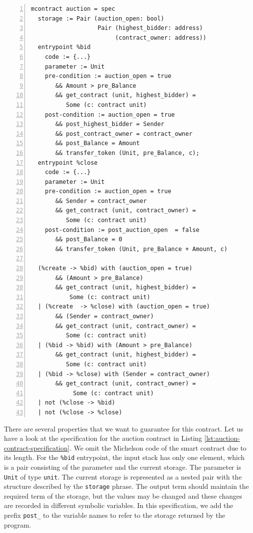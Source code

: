 \documentclass[a4paper,USenglish,cleveref, autoref,anonymous]{lipics-v2021}
\begin{document}
\begin{lstlisting}[float=tp,captionpos=b,caption={Auction contract specification},label={lst:auction-contract-specification},numbers=left]
mcontract auction = spec 
  storage := Pair (auction_open: bool) 
                   Pair (highest_bidder: address)
                        (contract_owner: address))
  entrypoint %bid
    code := {...}
    parameter := Unit 
    pre-condition := auction_open = true
       && Amount > pre_Balance
       && get_contract (unit, highest_bidder) = 
          Some (c: contract unit)
    post-condition := auction_open = true
       && post_highest_bidder = Sender 
       && post_contract_owner = contract_owner 
       && post_Balance = Amount 
       && transfer_token (Unit, pre_Balance, c);
  entrypoint %close
    code := {...}
    parameter := Unit
    pre-condition := auction_open = true
       && Sender = contract_owner  
       && get_contract (unit, contract_owner) = 
          Some (c: contract unit)              
    post-condition := post_auction_open  = false
       && post_Balance = 0 
       && transfer_token (Unit, pre_Balance + Amount, c) 

  (%create -> %bid) with (auction_open = true)  
       && (Amount > pre_Balance) 
       && get_contract (unit, highest_bidder) = 
           Some (c: contract unit)
  | (%create  -> %close) with (auction_open = true) 
       && (Sender = contract_owner)
       && get_contract (unit, contract_owner) = 
          Some (c: contract unit)
  | (%bid -> %bid) with (Amount > pre_Balance) 
       && get_contract (unit, highest_bidder) = 
          Some (c: contract unit)
  | (%bid -> %close) with (Sender = contract_owner) 
       && get_contract (unit, contract_owner) = 
            Some (c: contract unit)
  | not (%close -> %bid)
  | not (%close -> %close)
\end{lstlisting}

There are several properties that we want to guarantee for this
contract. Let us have a look at the specification for the auction
contract in Listing \ref{lst:auction-contract-specification}. We omit
the Michelson code of the smart contract due to its length.  For the
\lstinline/%bid/ entrypoint, the input stack has only one element,
which is a pair consisting of the parameter and the current
storage. The parameter is \lstinline/Unit/ of type \lstinline/unit/.
The current storage is represented as a nested pair with the
structure described by the \lstinline|storage| phrase. 
The output term should maintain the required term of the storage,
but the values may be changed and these changes are recorded in
different symbolic variables. In this specification, we add the prefix
\lstinline/post_/ to the variable names to refer to the storage
returned by the program.
\end{document}
